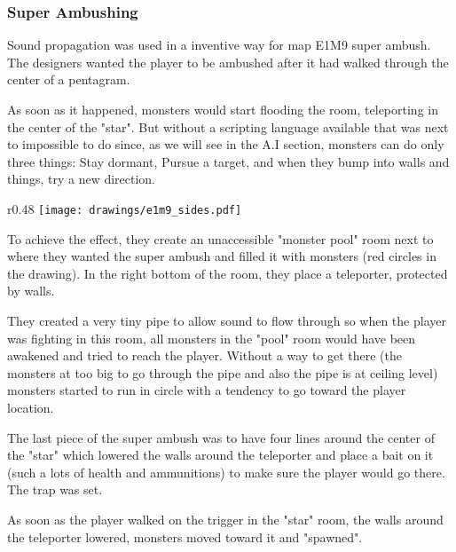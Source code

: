 \subsubsection{Super Ambushing}
Sound propagation was used in a inventive way for map E1M9 super ambush.  The designers wanted the player to be ambushed after it had walked through the center of a pentagram.\\
\par
 As soon as it happened, monsters would start flooding the room, teleporting in the center of the "star". But without a scripting language available that was next to impossible to do since, as we will see in the A.I section, monsters can do only three things: Stay dormant, Pursue a target, and when they bump into walls and things, try a new direction.\\
\par
\begin{wrapfigure}[22]{r}{0.48\textwidth}
\centering
\texttt{[image: drawings/e1m9\_sides.pdf]}
\end{wrapfigure}

\par

To achieve the effect, they create an unaccessible "monster pool" room next to where they wanted the super ambush and filled it with monsters (red circles in the drawing). In the right bottom of the room, they place a teleporter, protected by walls.\\
\par
They created a very tiny pipe to allow sound to flow through so when the player was fighting in this room, all monsters in the "pool" room would have been awakened and tried to reach the player. Without a way to get there (the monsters at too big to go through the pipe and also the pipe is at ceiling level) monsters started to run in circle with a tendency to go toward the player location.\\
\par
The last piece of the super ambush was to have four lines around the center of the "star" which lowered the walls around the teleporter and place a bait on it (such a lots of health and ammunitions) to make sure the player would go there. The trap was set.\\
\par

As soon as the player walked on the trigger in the "star" room, the walls around the teleporter lowered, monsters moved toward it and "spawned". \\
\par
{}\\
\pagebreak

